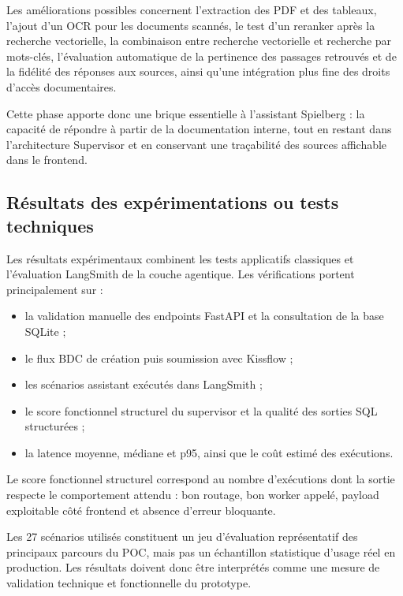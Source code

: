 \documentclass[a4paper,11pt,english,openany]{book}
\begin{document}
Les améliorations possibles concernent l'extraction des PDF et des tableaux, l'ajout d'un OCR pour les documents scannés, le test d'un reranker après la recherche vectorielle, la combinaison entre recherche vectorielle et recherche par mots-clés, l'évaluation automatique de la pertinence des passages retrouvés et de la fidélité des réponses aux sources, ainsi qu'une intégration plus fine des droits d'accès documentaires.


Cette phase apporte donc une brique essentielle à l'assistant Spielberg : la capacité de répondre à partir de la documentation interne, tout en restant dans l'architecture Supervisor et en conservant une traçabilité des sources affichable dans le frontend.

\subsection{Résultats des expérimentations ou tests techniques}

\begingroup
\setlength{\parskip}{0.22em plus 0.05em minus 0.05em}
\setlength{\textfloatsep}{0.35em plus 0.1em minus 0.1em}
\setlength{\floatsep}{0.35em plus 0.1em minus 0.1em}
\setlength{\intextsep}{0.35em plus 0.1em minus 0.1em}
\captionsetup{skip=2pt}

Les résultats expérimentaux combinent les tests applicatifs classiques et l'évaluation LangSmith de la couche agentique. Les vérifications portent principalement sur :
\begin{itemize}
    \item la validation manuelle des endpoints FastAPI et la consultation de la base SQLite ;
    \item le flux BDC de création puis soumission avec Kissflow ;
    \item les scénarios assistant exécutés dans LangSmith ;
    \item le score fonctionnel structurel du supervisor et la qualité des sorties SQL structurées ;
    \item la latence moyenne, médiane et p95, ainsi que le coût estimé des exécutions.
\end{itemize}

Le score fonctionnel structurel correspond au nombre d'exécutions dont la sortie respecte le comportement attendu : bon routage, bon worker appelé, payload exploitable côté frontend et absence d'erreur bloquante.

Les 27 scénarios utilisés constituent un jeu d'évaluation représentatif des principaux parcours du POC, mais pas un échantillon statistique d'usage réel en production. Les résultats doivent donc être interprétés comme une mesure de validation technique et fonctionnelle du prototype.
\end{document}
